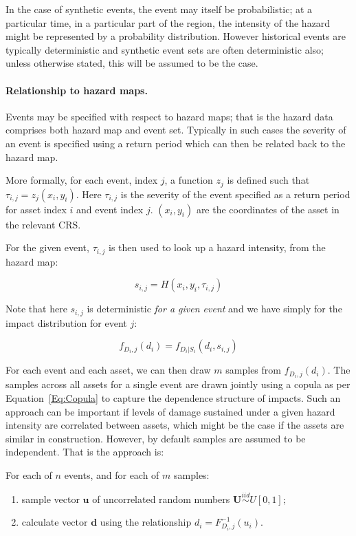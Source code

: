 \documentclass[a4paper,11pt]{extarticle} %
\begin{document}
In the case of synthetic events, the event may itself be probabilistic; at a particular time, in a particular part of the region, the intensity of the hazard might be represented by a probability distribution. However historical events are typically deterministic and synthetic event sets are often deterministic also; unless otherwise stated, this will be assumed to be the case.

\paragraph{Relationship to hazard maps.}
Events may be specified with respect to hazard maps; that is the hazard data comprises both hazard map and event set. Typically in such cases the severity of an event is specified using a return period which can then be related back to the hazard map.

More formally, for each event, index $j$, a function $z_j$ is defined such that $\tau_{i, j} = z_j(x_i, y_i)$. Here $\tau_{i, j}$ is the severity of the event specified as a return period for asset index $i$ and event index $j$.  $(x_i, y_i)$ are the coordinates of the asset in the relevant CRS.

For the given event, $\tau_{i, j}$ is then used to look up a hazard intensity, from the hazard map:
 
 \begin{equation}
	\label{Eq:Severity1}
	s_{i, j} = H(x_i, y_i, \tau_{i, j}) 
\end{equation}

Note that here $s_{i, j}$ is deterministic \emph{for a given event} and we have simply for the impact distribution for event $j$:

 \begin{equation}
	\label{Eq:Severity2}
	f_{D_i, j}(d_i) = f_{D_i|S_i}(d_i, s_{i, j})
\end{equation}

For each event and each asset, we can then draw $m$ samples from $f_{D_i, j}(d_i)$. The samples across all assets for a single event are drawn jointly using a copula as per Equation~\ref{Eq:Copula} to capture the dependence structure of impacts. Such an approach can be important if levels of damage sustained under a given hazard intensity are correlated between assets, which might be the case if the assets are similar in construction. However, by default samples are assumed to be independent. That is the approach is:

For each of $n$ events, and for each of $m$ samples:
\begin{enumerate}[]
	\item sample vector $\mathbf{u}$ of uncorrelated random numbers $\mathbf{U} \stackrel{iid}{\sim} U[0, 1]$;
	\item calculate vector $\mathbf{d}$ using the relationship $d_i = F_{D_i, j}^{-1}(u_i)$.
\end{enumerate}
\end{document}

